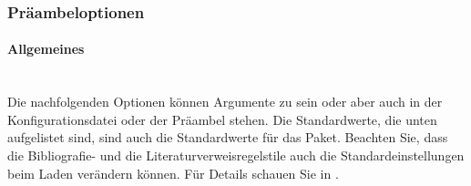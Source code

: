 \documentclass{ltxdockit}[2011/03/25]
\begin{document}
\subsubsection{Präambeloptionen} \label{use:opt:pre}

\paragraph{Allgemeines} \label{use:opt:pre:gen} \hfill \\ 

Die nachfolgenden Optionen
können Argumente zu  sein oder aber auch in der
Konfigurationsdatei oder der Präambel stehen. Die Standardwerte, die unten
aufgelistet sind, sind auch die Standardwerte für das Paket. Beachten Sie, dass
die Bibliografie- und die Literaturverweisregelstile auch die
Standardeinstellungen beim Laden verändern können. Für Details schauen Sie in
.
\end{document}
